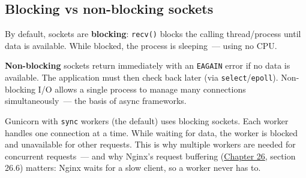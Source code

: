 \begin{codebox}[short]

\begin{Shaded}
\begin{Highlighting}[]
\OperatorTok{=} 
 \NormalTok{:}
\OperatorTok{=}\NormalTok{)  }
     
          
\OperatorTok{+=}
      
          
\end{Highlighting}
\end{Shaded}

\end{codebox}

\subsection*{Blocking vs non-blocking sockets}\label{30-kernel-application-handoff:blocking-vs-non-blocking-sockets}

By default, sockets are \textbf{blocking}: \texttt{recv()} blocks the calling thread/process until data is available. While blocked, the process is sleeping~--- using no CPU.

\textbf{Non-blocking} sockets return immediately with an \texttt{EAGAIN} error if no data is available. The application must then check back later (via \texttt{select}/\texttt{epoll}). Non-blocking I/O allows a single process to manage many connections simultaneously~--- the basis of async frameworks.

Gunicorn with \texttt{sync} workers (the default) uses blocking sockets. Each worker handles one connection at a time. While waiting for data, the worker is blocked and unavailable for other requests. This is why multiple workers are needed for concurrent requests~--- and why Nginx's request buffering (\hyperref[ch:26-network-stack-flow]{Chapter 26}, section 26.6) matters: Nginx waits for a slow client, so a worker never has to.

